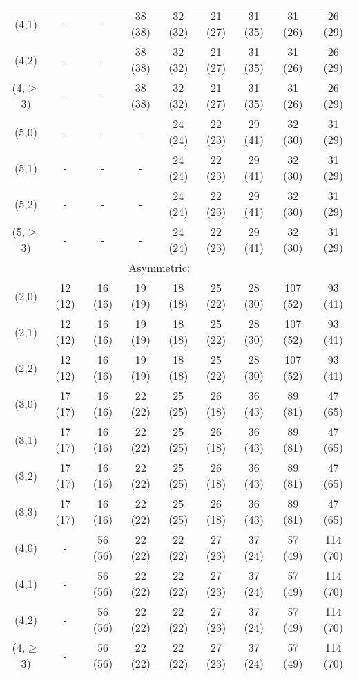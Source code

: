 \begin{table}[h!]
\begin{tabular}{ ccccccccc }
    (4,1)       & -        & -       & 38 (38) & 32 (32) & 21 (27) & 31 (35) & 31 (26)  & 26 (29)   \\
    (4,2)       & -        & -       & 38 (38) & 32 (32) & 21 (27) & 31 (35) & 31 (26)  & 26 (29)   \\
    (4,$\geq$3) & -        & -       & 38 (38) & 32 (32) & 21 (27) & 31 (35) & 31 (26)  & 26 (29)   \\
    (5,0)       & -        & -       & -       & 24 (24) & 22 (23) & 29 (41) & 32 (30)  & 31 (29)   \\
    (5,1)       & -        & -       & -       & 24 (24) & 22 (23) & 29 (41) & 32 (30)  & 31 (29)   \\
    (5,2)       & -        & -       & -       & 24 (24) & 22 (23) & 29 (41) & 32 (30)  & 31 (29)   \\
    (5,$\geq$3) & -        & -       & -       & 24 (24) & 22 (23) & 29 (41) & 32 (30)  & 31 (29)   \\
    \hline
    \multicolumn{8}{c}{Asymmetric:}                                                                 \\
    (2,0)       & 12 (12)  & 16 (16) & 19 (19) & 18 (18) & 25 (22) & 28 (30) & 107 (52) & 93   (41) \\
    (2,1)       & 12 (12)  & 16 (16) & 19 (19) & 18 (18) & 25 (22) & 28 (30) & 107 (52) & 93   (41) \\
    (2,2)       & 12 (12)  & 16 (16) & 19 (19) & 18 (18) & 25 (22) & 28 (30) & 107 (52) & 93   (41) \\
    (3,0)       & 17 (17)  & 16 (16) & 22 (22) & 25 (25) & 26 (18) & 36 (43) & 89 (81)  & 47   (65) \\
    (3,1)       & 17 (17)  & 16 (16) & 22 (22) & 25 (25) & 26 (18) & 36 (43) & 89 (81)  & 47   (65) \\
    (3,2)       & 17 (17)  & 16 (16) & 22 (22) & 25 (25) & 26 (18) & 36 (43) & 89 (81)  & 47   (65) \\
    (3,3)       & 17 (17)  & 16 (16) & 22 (22) & 25 (25) & 26 (18) & 36 (43) & 89 (81)  & 47   (65) \\
    (4,0)       & -        & 56 (56) & 22 (22) & 22 (22) & 27 (23) & 37 (24) & 57 (49)  & 114  (70) \\
    (4,1)       & -        & 56 (56) & 22 (22) & 22 (22) & 27 (23) & 37 (24) & 57 (49)  & 114  (70) \\
    (4,2)       & -        & 56 (56) & 22 (22) & 22 (22) & 27 (23) & 37 (24) & 57 (49)  & 114  (70) \\
    (4,$\geq$3) & -        & 56 (56) & 22 (22) & 22 (22) & 27 (23) & 37 (24) & 57 (49)  & 114  (70) \\

\end{tabular}
\end{table}
